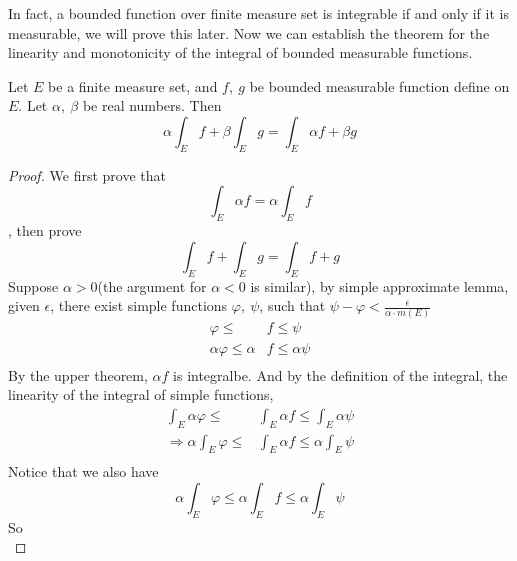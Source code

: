 \documentclass[lang=en, 12pt]{elegantbook}
\begin{document}
            In fact, a bounded function over finite measure set is integrable if and only if it is measurable, we will prove this later.
        Now we can establish the theorem for the linearity and monotonicity of the integral of bounded measurable functions.
            \begin{theorem}[Linearity]
                Let $E$ be a finite measure set, and $f, \ g$ be bounded measurable function define on $E$. Let $\alpha, \ \beta$ be
            real numbers. Then
                \begin{equation}
                    \alpha \int_E f + \beta \int_E g = \int_E \alpha f + \beta g
                \end{equation}
            \end{theorem}
            \begin{proof}
                We first prove that $$\int_E \alpha f = \alpha \int_E f$$, then prove $$\int_E f + \int_E g = \int_E f+g $$
            Suppose $\alpha>0$(the argument for $\alpha <0$ is similar), by simple approximate lemma, given $\epsilon$, there exist simple
            functions $\varphi, \ \psi$, such that $\psi - \varphi < \frac{\epsilon}{\alpha \cdot m(E)}$
                \begin{equation*}
                    \begin{aligned}
                        \varphi \leq &f \leq \psi \\
                        \alpha \varphi \leq \alpha&f \leq \alpha\psi \\
                    \end{aligned}
                \end{equation*}
            By the upper theorem, $\alpha f$ is integralbe. And by the definition of the integral, the linearity of the integral of simple functions,
            \begin{equation*}
                \begin{aligned}
                    \int_E \alpha \varphi \leq &\int_E \alpha f \leq \int_E \alpha \psi\\
                    \Rightarrow \alpha \int_E \varphi \leq &\int_E \alpha f \leq \alpha \int_E \psi\\ 
                \end{aligned}
            \end{equation*}
            Notice that we also have 
            $$\alpha \int_E \varphi \leq \alpha \int_E f \leq \alpha \int_E \psi$$
            So 
            \begin{equation*}

\end{equation*}
\end{proof}
\end{document}
